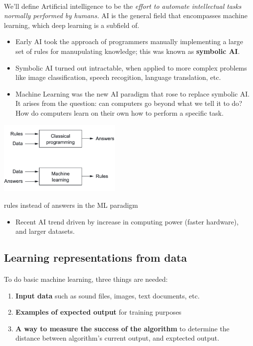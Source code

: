 \documentclass[12pt, a4paper]{article}
\begin{document}
\paragraph*{}
We'll define Artificial intelligence to be the \textit{effort to automate intellectual 
tasks normally performed by humans.} AI is the general field that encompasses machine learning,
which deep learning is a subfield of.

\begin{itemize}
   \item Early AI took the approach of programmers manually implementing a large set of 
   rules for manupulating knowledge; this was known as \textbf{symbolic AI}.
   
   \item Symbolic AI turned out intractable, when applied to more complex problems like
   image classification, speech recogition, language translation, etc.
   
   \item Machine Learning was the new AI paradigm that rose to replace symbolic AI. It arises
   from the question: can computers go beyond what we tell it to do? How do computers learn
   on their own how to perform a specific task.
\end{itemize}

{
   \centering
   \includegraphics[width=6cm]{ML_new_paradigm.png}

    rules instead of answers in the ML paradigm

}

\begin{itemize}
   \item Recent AI trend driven by increase in computing power (faster hardware), and larger datasets.
\end{itemize}

\subsection{Learning representations from data}

\paragraph*{}
To do basic machine learning, three things are needed:
\begin{enumerate}
   \item \textbf{Input data} such as sound files, images, text documents, etc.
   \item \textbf{Examples of expected output} for training purposes
   \item \textbf{A way to measure the success of the algorithm} to determine the distance between
   algorithm's current output, and exptected output. 
\end{enumerate}
\end{document}

